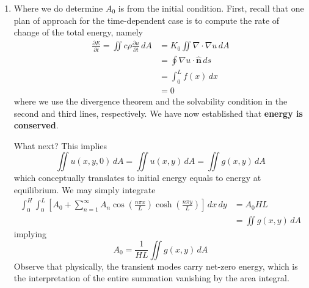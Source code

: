 \documentclass[a4paper]{article}
\begin{document}
\begin{enumerate}[label=(\alph*)]
\begin{align*}
		\int^{L}_{0} \frac{\partial u}{\partial y}\!\left( x,H \right) \, dx & = \sum^{\infty}_{n=1} A_{n}\!\left( \frac{n \pi}{L} \right)\sinh\!\left(\frac{n \pi H}{L}\right)\int^{L}_{0} \cos\!\left(\frac{n \pi x}{L}\right) \, dx \\
										     & = \int^{L}_{0} f \!\left( x \right) \, dx \\ 
										     & = 0    
	\end{align*}
	Which is consistent with the solvability condition in part (a). The other insight here is that \( A_{0} \) \textit{is undetermined from the boundary conditions}, and in equilibrium, \textit{any} value of \( A_{0} \) is consistent with all four boundary conditions.
	\item Where we do determine \( A_{0} \) is from the initial condition. First, recall that one plan of approach for the time-dependent case is to compute the rate of change of the total energy, namely
	\begin{align*}
		\frac{\partial E}{\partial t} = \iint c \rho \frac{\partial u}{\partial t} \, dA & = K_{0}\iint \nabla \cdot \nabla u \, dA \\
		 & = \oint \nabla u \cdot \pmb{\hat{n}} \, ds \\
		 & = \int^{L}_{0} f \!\left( x \right) \, dx \\
		 & = 0
	\end{align*}
	where we use the divergence theorem and the solvability condition in the second and third lines, respectively. We have now established that \textbf{energy is conserved}.

	What next? This implies
	\[
		\iint u \!\left( x,y,0 \right) \, dA = \iint u \!\left( x,y \right) \, dA = \iint g \!\left( x,y \right) \, dA 
	\]
	which conceptually translates to initial energy equals to energy at equilibrium. We may simply integrate
	\begin{align*}
		\int^{H}_{0} \int^{L}_{0} \!\left[ A_{0} + \sum^{\infty}_{n=1} A_{n}\cos\!\left(\frac{n \pi x}{L}\right)\cosh\!\left(\frac{n \pi y}{L}\right) \right] \, dx \, dy & = A_{0}HL \\
		 & = \iint g \!\left( x,y \right) \, dA
	\end{align*}
	implying
	\[
		A_{0} = \frac{1}{HL}\iint g \!\left( x,y \right) \, dA 
	\]
	Observe that physically, the transient modes carry net-zero energy, which is the interpretation of the entire summation vanishing by the area integral.
\end{enumerate}
\end{document}

